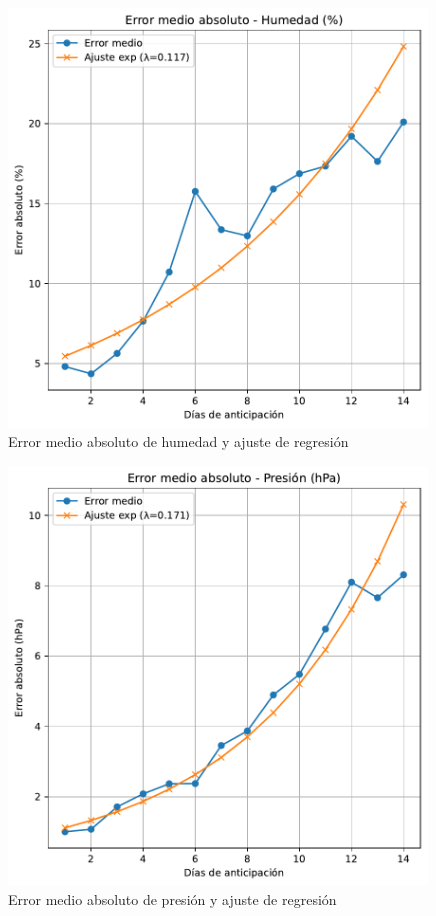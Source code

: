 \documentclass[
  10pt,
  a4paper,
  DIV=11,
  numbers=noendperiod,
  open=any]{scrreprt}
\numberwithin{equation}{chapter}
\numberwithin{equation}{section}
\renewcommand{\[}{\begin{equation}}
\renewcommand{\]}{\end{equation}}
\begin{document}
\begin{figure}[h]
  \centering
  \includegraphics[width=0.99\textwidth]{03-meteorologia/predicciones_files/figure-pdf/cell-4-output-2.pdf}
  \caption{Error medio absoluto de humedad y ajuste de regresión}
\end{figure}

\begin{figure}[h]
  \centering
  \includegraphics[width=0.99\textwidth]{03-meteorologia/predicciones_files/figure-pdf/cell-4-output-3.pdf}
  \caption{Error medio absoluto de presión y ajuste de regresión}
\end{figure}
\end{document}
